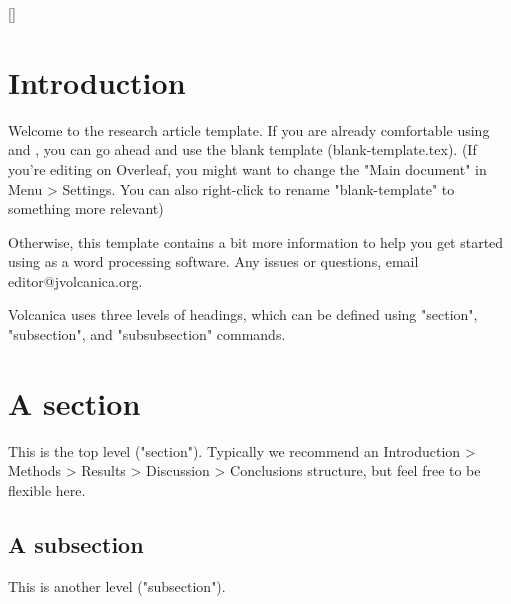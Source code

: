 \documentclass[draft, english]{volcanica-template}
\author[{{\affiliation{1}}}] 				%
{\orcidaffil{0000-0001-7437-3916}~			%
Kaustav Bhattacharjee 				%
\Email{kaustav2082@gmail.com}} 		        	%
\author[{{\affiliation{1}}}] 				%
{\orcidaffil{0000.0000.0000.0000}~			%
Adityan Santhakumar} 					        	%
\affil[{{\affiliation{1}}}]{					%
Indian Institute of Technology Roorkee, Roorkee, Uttarakhand 247667, India.}
\begin{document}
\FrontMatter{\protect{\lipsum[45]}}
[]%
{					
}

\hypertarget{introduction}{%
\section{Introduction}\label{introduction}}		%

Welcome to the \VOLCANICA research article \latex template. If you are already comfortable using \latex and \bibtex, you can go ahead and use the blank template (blank-template.tex). (If you're editing on Overleaf, you might want to change the "Main document" in Menu > Settings. You can also right-click to rename "blank-template" to something more relevant)

Otherwise, this template contains a bit more information to help you get started using \latex as a word processing software. Any issues or questions, email editor@jvolcanica.org.

Volcanica uses three levels of headings, which can be defined using "section", "subsection", and "subsubsection" commands.

\section{A section}\label{sec:02}
This is the top level ("section"). Typically we recommend an Introduction > Methods > Results > Discussion > Conclusions structure, but feel free to be flexible here.

\subsection{A subsection}\label{sec:02a}
This is another level ("subsection").
\end{document}
